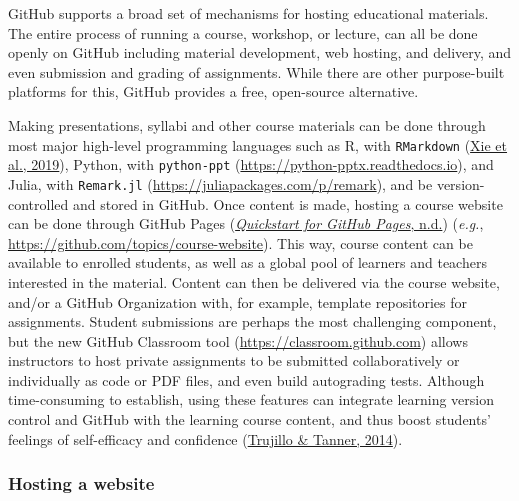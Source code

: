GitHub supports a broad set of mechanisms for hosting educational materials.
The entire process of running a course, workshop, or lecture, can all be done openly on GitHub including material development, web hosting, and delivery, and even submission and grading of assignments.
While there are other purpose-built platforms for this, GitHub provides a free, open-source alternative.

Making presentations, syllabi and other course materials can be done through most major high-level programming languages such as R, with \texttt{RMarkdown} (\protect\hyperlink{ref-QqMezOMg}{Xie et al., 2019}), Python, with \texttt{python-ppt} (\url{https://python-pptx.readthedocs.io}), and Julia, with \texttt{Remark.jl} (\url{https://juliapackages.com/p/remark}), and be version-controlled and stored in GitHub.
Once content is made, hosting a course website can be done through GitHub Pages (\protect\hyperlink{ref-MDQfMwCW}{\emph{Quickstart for GitHub Pages}, n.d.}) (\emph{e.g.}, \url{https://github.com/topics/course-website}).
This way, course content can be available to enrolled students, as well as a global pool of learners and teachers interested in the material.
Content can then be delivered via the course website, and/or a GitHub Organization with, for example, template repositories for assignments.
Student submissions are perhaps the most challenging component, but the new GitHub Classroom tool (\url{https://classroom.github.com}) allows instructors to host private assignments to be submitted collaboratively or individually as code or PDF files, and even build autograding tests.
Although time-consuming to establish, using these features can integrate learning version control and GitHub with the learning course content, and thus boost students' feelings of self-efficacy and confidence (\protect\hyperlink{ref-dqrFjoSb}{Trujillo \& Tanner, 2014}).

\hypertarget{hosting-a-website}{%
\subsubsection{Hosting a website}\label{hosting-a-website}}

